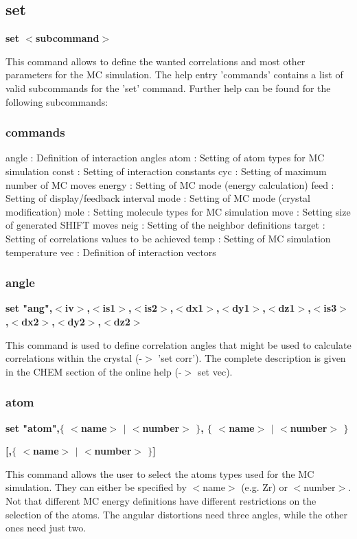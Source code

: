 \subsection*{set}
{\bf set $ <$subcommand$> $ \par }
\par
\vspace{3pt}
This command allows to define the wanted correlations and most other 
parameters for the MC simulation. The help entry 'commands' contains 
a list of valid subcommands for the 'set' command. Further help can 
be found for the following subcommands: 
\par
\subsubsection{commands}
\begin{MacVerbatim}
angle   : Definition of interaction angles
atom    : Setting of atom types for MC simulation
const   : Setting of interaction constants
cyc     : Setting of maximum number of MC moves
energy  : Setting of MC mode (energy calculation)
feed    : Setting of display/feedback interval
mode    : Setting of MC mode (crystal modification)
mole    : Setting molecule types for MC simulation
move    : Setting size of generated SHIFT moves
neig    : Setting of the neighbor definitions
target  : Setting of correlations values to be achieved
temp    : Setting of MC simulation temperature
vec     : Definition of interaction vectors
\end{MacVerbatim}
\subsubsection{angle}
{\bf set "ang",$ <$iv$> $,$ <$is1$> $,$ <$is2$> $,$ <$dx1$> $,$ <$dy1$> $,$ <$dz1$> $,$ <$is3$> $,$ <$dx2$> $,$ <$dy2$> $,$ <$dz2$> $ \par }
\par
\vspace{3pt}
This command is used to define correlation angles that might be used 
to calculate correlations within the crystal (-$> $ 'set corr'). The 
complete description is given in the CHEM section of the online 
help (-$> $ set vec). 
\subsubsection{atom}
{\bf set "atom",$ \{$ $ <$name$> $ $| $ $ <$number$> $ $\} $, $ \{$ $ <$name$> $ $| $ $ <$number$> $ $\} $ \par }
{\bf          [,$ \{$ $ <$name$> $ $| $ $ <$number$> $ $\} $] \par }
\par
\vspace{3pt}
This command allows the user to select the atoms types used for 
the MC simulation. They can either be specified by $ <$name$> $ (e.g. Zr) 
or $ <$number$> $. Not that different MC energy definitions have different 
restrictions on the selection of the atoms. 
The angular distortions need three angles, while the other ones 
need just two. 
